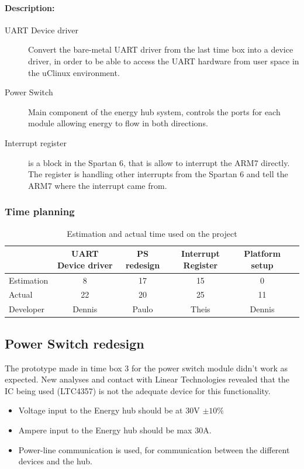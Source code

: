 \paragraph{Description:}
\begin{description}
	\item[UART Device driver] Convert the bare-metal UART driver from the last time box into a device driver, in order to be able to access the UART hardware from user space in the uClinux environment.
	\item[Power Switch] Main component of the energy hub system, controls the ports for each module allowing energy to flow in both directions.
	\item[Interrupt register] is a block in the Spartan 6, that is allow to interrupt the ARM7 directly. The register is handling other interrupts from the Spartan 6 and tell the ARM7 where the interrupt came from.
\end{description}
\subsubsection{Time planning}
\begin{table}[H]
\centering
	\begin{tabular}{|l|c|c|c|c|c|}
		\hline
		~			& UART Device driver	& PS redesign		& Interrupt Register	& Platform setup\\ \hline
		Estimation	& 8						& 17				& 15				& 0			  \\
		Actual		& 22					& 20				& 25				& 11		  \\
		Developer	& Dennis				& Paulo				& Theis				& Dennis	  \\
		\hline
	\end{tabular}
	\caption{Estimation and actual time used on the project}
\end{table}

\subsection{Power Switch redesign}
The prototype made in time box 3 for the power switch module didn't work as expected. New analyses and contact with Linear Technologies revealed that the IC being used (LTC4357) is not the adequate device for this functionality.

\begin{itemize}
	\item Voltage input to the Energy hub should be at 30V $ \pm10\% $
	\item Ampere input to the Energy hub should be max 30A.
	\item Power-line communication is used, for communication between the different devices and the hub.
\end{itemize}


